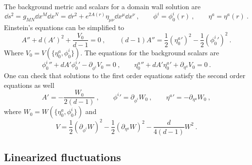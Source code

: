 The background metric and scalars for a domain wall solution are 
\begin{equation}
	\dd s^2=g_{MN}\dd x^M \dd x^N=\dd r^2+e^{2A(r)}\eta_{\mu\nu}\dd x^\mu \dd x^\nu
	\ ,\qquad 
	\phi^i=\phi^i_0(r)
	\ ,\qquad 
	\eta^a=\eta^a(r)\ .
\end{equation}
Einstein's equations can be simplified to
\begin{equation}\label{eq:Einsbackg}
	A''+d(A')^2+\frac{V_0}{d-1}=0
	\ ,\qquad 
	(d-1)A''=\frac{1}{2}({\eta_0^a}')^2-\frac{1}{2}({\phi_0^i}')^2\ .
\end{equation}
Where $V_0=V(\{\eta^a_0,\phi^i_0\})$. The equations for the background scalars are
\begin{equation}\label{eq:scalarbackg}
	{\phi_0^i}''+dA'{\phi_0^i}'-\partial_{\phi^i}V_0=0
	\ ,\qquad {\eta_0^a}''+dA'{\eta_0^a}'+\partial_{\eta^a}V_0=0\ .
\end{equation}
One can check that solutions to the first order equations satisfy the second order equations as well
\begin{equation}
   A'=-\frac{W_0}{2(d-1)}
   \ ,\qquad {\phi^i}'=\partial_{\phi^i}W_0
   \ ,\qquad
   {\eta^a}'=-\partial_{\eta^a}W_0\ ,
\end{equation}
where $W_0=W(\{\eta^a_0,\phi^i_0\})$ and
\begin{equation}
	V=\frac{1}{2}(\partial_{\phi^i}W)^2-\frac{1}{2}(\partial_{\eta^a} W)^2-\frac{d}{4(d-1)}W^2\ .
\end{equation}

\subsection{Linearized fluctuations}

